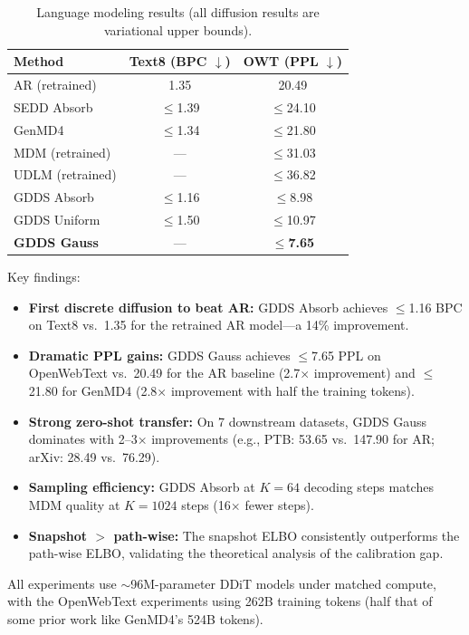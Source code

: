 \documentclass[11pt]{article}
\begin{document}
\begin{table}[h]
\centering
\caption{Language modeling results (all diffusion results are variational upper bounds).}
\begin{tabular}{lcc}
\toprule
\textbf{Method} & \textbf{Text8 (BPC $\downarrow$)} & \textbf{OWT (PPL $\downarrow$)} \\
\midrule
AR (retrained) & 1.35 & 20.49 \\
\midrule
SEDD Absorb & $\leq$1.39 & $\leq$24.10 \\
GenMD4 & $\leq$1.34 & $\leq$21.80 \\
MDM (retrained) & --- & $\leq$31.03 \\
UDLM (retrained) & --- & $\leq$36.82 \\
\midrule
GDDS Absorb & $\leq$1.16 & $\leq$8.98 \\
GDDS Uniform & $\leq$1.50 & $\leq$10.97 \\
\textbf{GDDS Gauss} & --- & $\leq$\textbf{7.65} \\
\bottomrule
\end{tabular}
\end{table}

Key findings:
\begin{itemize}
    \item \textbf{First discrete diffusion to beat AR:} GDDS Absorb achieves $\leq$1.16 BPC on Text8 vs.\ 1.35 for the retrained AR model---a 14\% improvement.
    \item \textbf{Dramatic PPL gains:} GDDS Gauss achieves $\leq$7.65 PPL on OpenWebText vs.\ 20.49 for the AR baseline (2.7$\times$ improvement) and $\leq$21.80 for GenMD4 (2.8$\times$ improvement with half the training tokens).
    \item \textbf{Strong zero-shot transfer:} On 7 downstream datasets, GDDS Gauss dominates with 2--3$\times$ improvements (e.g., PTB: 53.65 vs.\ 147.90 for AR; arXiv: 28.49 vs.\ 76.29).
    \item \textbf{Sampling efficiency:} GDDS Absorb at $K=64$ decoding steps matches MDM quality at $K=1024$ steps (16$\times$ fewer steps).
    \item \textbf{Snapshot $>$ path-wise:} The snapshot ELBO consistently outperforms the path-wise ELBO, validating the theoretical analysis of the calibration gap.
\end{itemize}

All experiments use $\sim$96M-parameter DDiT models under matched compute, with the OpenWebText experiments using 262B training tokens (half that of some prior work like GenMD4's 524B tokens).
\end{document}
